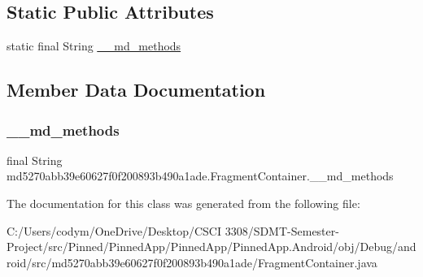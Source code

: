 \subsection*{Static Public Attributes}
\begin{DoxyCompactItemize}
\item 
static final String \hyperlink{classmd5270abb39e60627f0f200893b490a1ade_1_1_fragment_container_a5e152354be6320af362304f8c061ed9b}{\+\_\+\+\_\+md\+\_\+methods}
\end{DoxyCompactItemize}


\subsection{Member Data Documentation}
\mbox{\label{classmd5270abb39e60627f0f200893b490a1ade_1_1_fragment_container_a5e152354be6320af362304f8c061ed9b}} 
\subsubsection{\texorpdfstring{\+\_\+\+\_\+md\+\_\+methods}{\_\_md\_methods}}
{\footnotesize\ttfamily final String md5270abb39e60627f0f200893b490a1ade.\+Fragment\+Container.\+\_\+\+\_\+md\+\_\+methods\hspace{0.3cm}{\ttfamily [static]}}



The documentation for this class was generated from the following file\+:\begin{DoxyCompactItemize}
\item 
C\+:/\+Users/codym/\+One\+Drive/\+Desktop/\+C\+S\+C\+I 3308/\+S\+D\+M\+T-\/\+Semester-\/\+Project/src/\+Pinned/\+Pinned\+App/\+Pinned\+App/\+Pinned\+App.\+Android/obj/\+Debug/android/src/md5270abb39e60627f0f200893b490a1ade/Fragment\+Container.\+java\end{DoxyCompactItemize}
